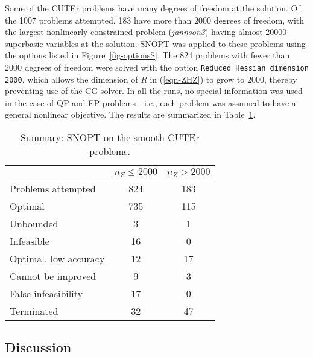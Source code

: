 \documentclass[draft,leqno,onefignum,onetabnum]{siamltex}
\def\Z{_{\scriptscriptstyle Z}}
\def\strut{\rule[-1.25ex]{0pt}{4ex}}%
\def\strutl{\rule[-1.25ex]{0pt}{3ex}}%
\def\strutu{\rule{0pt}{3ex}}%
\def\v#1{\texttt{#1}}
\def\CUTEr {{\small CUTEr}}
\def\SNOPT {{\small SNOPT}}
\def\Cute#1{\hbox{\it\lowercase{#1}\/}}
\begin{document}
Some of the \CUTEr{} problems have many degrees of freedom at the
solution.  Of the 1007 problems attempted, 183 have more than 2000
degrees of freedom, with the largest nonlinearly constrained problem
(\Cute{JANNSON3}) having almost 20000 superbasic variables at the
solution.  \SNOPT{} was applied to these problems using the options
listed in Figure~\ref{fig-optionsS}.  The 824 problems with fewer than
2000 degrees of freedom were solved with the option \v{Reduced Hessian
  dimension 2000}, which allows the dimension of $R$ in (\ref{eqn-ZHZ})
to grow to 2000, thereby preventing use of the CG solver.
In all the runs, no special information was used in the case of
QP and FP problems---i.e., each problem was assumed to have a general
nonlinear objective.  The results are summarized in
Table~\ref{table_compareALL}.


\begin{table}[htp]
\caption{Summary: SNOPT on the smooth CUTEr problems.}
\label{table_compareALL}
\begin{center} \footnotesize
  \def\t{\phantom2} 
\begin{tabular}{|l|c|c|}\hline
\strut                         &$n\Z \le2000$&$n\Z >2000$\\\hline
\strut   Problems attempted    &      824    &    183    \\\hline
\strutu  Optimal               &      735    &    115    \\
         Unbounded             &    \t\t3    &  \t\t1    \\
\strutl  Infeasible            &     \t16    &  \t\t0    \\\hline %
\strutu  Optimal, low accuracy &     \t12    &   \t17    \\
         Cannot be improved    &    \t\t9    &  \t\t3    \\       %
         False infeasibility   &     \t17    &  \t\t0    \\       %
\strutl  Terminated            &     \t32    &   \t47    \\\hline
\end{tabular}
\end{center}
\end{table}

\subsection*{Discussion}
\end{document}
